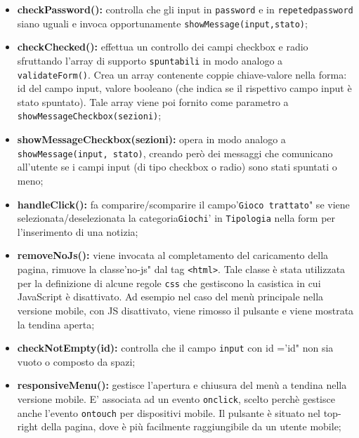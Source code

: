 \begin{itemize}
	\item \textbf{checkPassword(): } controlla che gli input in \texttt{password} e in \texttt{repetedpassword} siano uguali e invoca opportunamente \texttt{showMessage(input,stato)}; \\

	\item \textbf{checkChecked(): } effettua un controllo dei campi checkbox e radio sfruttando l'array di supporto \texttt{spuntabili} in modo analogo a \texttt{validateForm()}. Crea un array contenente coppie chiave-valore nella forma: id del campo input, valore booleano (che indica se il rispettivo campo input è stato spuntato). Tale array viene poi fornito come parametro a \texttt{showMessageCheckbox(sezioni)}; \\

	\item \textbf{showMessageCheckbox(sezioni): } opera in modo analogo a \texttt{showMessage(input, stato)}, creando però dei messaggi che comunicano all'utente se i campi input (di tipo checkbox o radio) sono stati spuntati o meno; \\

	\item \textbf{handleClick(): } fa comparire/scomparire il campo\n'\texttt{Gioco trattato}" se viene selezionata/deselezionata la categoria\n\texttt{Giochi}' in \texttt{Tipologia} nella form per l'inserimento di una notizia; \\

	\item \textbf{removeNoJs(): }  viene invocata al completamento del caricamento della pagina, rimuove la classe\n'no-js" dal tag \texttt{<html>}. Tale classe è stata utilizzata per la definizione di alcune regole \texttt{css} che gestiscono la casistica in cui JavaScript è disattivato. Ad esempio nel caso del menù principale nella versione mobile, con JS disattivato, viene rimosso il pulsante e viene mostrata la tendina aperta; \\

	\item \textbf{checkNotEmpty(id): } controlla che il campo \texttt{input} con id =\n'id" non sia vuoto o composto da spazi; \\

	\item \textbf{responsiveMenu(): } gestisce l'apertura e chiusura del menù a tendina nella versione mobile.
	E' associata ad un evento \texttt{onclick}, scelto perchè gestisce anche l'evento \texttt{ontouch} per dispositivi mobile.
	Il pulsante è situato nel top-right della pagina, dove è più facilmente raggiungibile da un utente mobile; \\


\end{itemize}
